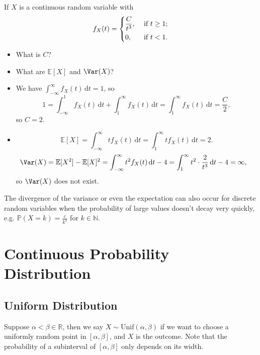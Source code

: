 \begin{eg}
    If \(X\) is a continuous random variable with 
    \[
        f_X(t) = \begin{dcases}
            \frac{C}{t^3}, &\text{ if } t \ge 1 ;\\
            0, &\text{ if } t < 1.
        \end{dcases}
    \]
    \begin{itemize}
        \item [(1)] What is \(C\)?
        \item [(2)] What are \(\mathbb{E} [X]\) and \(\Var(X)\)?  
    \end{itemize}
\end{eg}

\begin{explanation}
    \hfill 
    \begin{itemize}
        \item [(1)] We have \(\int _{-\infty }^{\infty } f_X(t) \, \mathrm{d} t = 1 \), so 
        \[
            1 = \int _{-\infty }^1 f_X(t) \, \mathrm{d} t + \int _{1}^{\infty} f_X(t) \, \mathrm{d} t = \int _{1}^{\infty} f_X(t) \, \mathrm{d} t = \frac{C}{2},  
        \]
        so \(C = 2\).
        \item [(2)]
        \[
            \mathbb{E} [X] = \int _{-\infty }^{\infty } t f_X(t) \, \mathrm{d} t = \int _1^{\infty } t f_X(t) \, \mathrm{d} t = 2.  
        \]
        \begin{align*}
            \Var(X) &= \mathbb{E} [X^2] - \mathbb{E} [X]^2 = \int _{-\infty }^{\infty } t^2 f_X(t) \, \mathrm{d} t - 4 = \int _1^{\infty } t^2 \cdot \frac{2}{t^3} \, \mathrm{d} t - 4 = \infty,  
        \end{align*}
        so \(\Var(X)\) does not exist. 
    \end{itemize}
\end{explanation}

\begin{remark}
    The divergence of the variance or even the expectation can also occur for discrete random variables when the probability of large values doesn't decay very quickly, e.g. \(\mathbb{P} (X = k) = \frac{c}{k^2}\) for \(k \in \mathbb{N} \).  
\end{remark}

\section{Continuous Probability Distribution}
\subsection{Uniform Distribution}
\begin{definition}
    Suppose \(\alpha < \beta \in \mathbb{R}\), then we say \(X \sim \mathrm{Unif}(\alpha , \beta ) \) if we want to choose a uniformly random point in \([\alpha , \beta ]\), and \(X\) is the outcome. Note that the probability of a subinterval of \([\alpha , \beta ]\) only depends on its width.      
\end{definition}

